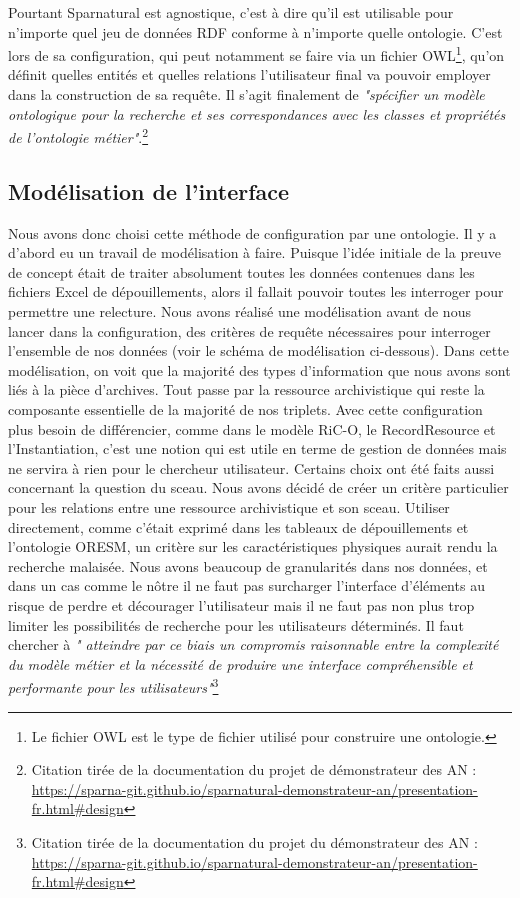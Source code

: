 \par
Pourtant Sparnatural est agnostique, c'est à dire qu'il est utilisable pour n'importe quel jeu de données RDF conforme à n'importe quelle ontologie. C'est lors de sa configuration, qui peut notamment se faire via un fichier OWL\footnote{Le fichier OWL est le type de fichier utilisé pour construire une ontologie.}, qu'on définit quelles entités et quelles relations l'utilisateur final va pouvoir employer dans la construction de sa requête. Il s'agit finalement de \textit{"spécifier un modèle ontologique pour la recherche et ses correspondances avec les classes et propriétés de l’ontologie métier"}.\footnote{Citation tirée de la documentation du projet de démonstrateur des AN : \href{https://sparna-git.github.io/sparnatural-demonstrateur-an/presentation-fr.html\#design}{https://sparna-git.github.io/sparnatural-demonstrateur-an/presentation-fr.html\#design}}


\subsection{Modélisation de l'interface}
Nous avons donc choisi cette méthode de configuration par une ontologie. Il y a d'abord eu un travail de modélisation à faire. Puisque l'idée initiale de la preuve de concept était de traiter absolument toutes les données contenues dans les fichiers Excel de dépouillements, alors il fallait pouvoir toutes les interroger pour permettre une relecture. Nous avons réalisé une modélisation avant de nous lancer dans la configuration, des critères de requête nécessaires pour interroger l'ensemble de nos données (voir le schéma de modélisation ci-dessous). Dans cette modélisation, on voit que la majorité des types d'information que nous avons sont liés à la pièce d'archives. Tout passe par la ressource archivistique qui reste la composante essentielle de la majorité de nos triplets. Avec cette configuration plus besoin de différencier, comme dans le modèle RiC-O, le RecordResource et l'Instantiation, c'est une notion qui est utile en terme de gestion de données mais ne servira à rien pour le chercheur utilisateur. Certains choix ont été faits aussi concernant la question du sceau. Nous avons décidé de créer un critère particulier pour les relations entre une ressource archivistique et son sceau. Utiliser directement, comme c'était exprimé dans les tableaux de dépouillements et l'ontologie ORESM, un critère sur les caractéristiques physiques aurait rendu la recherche malaisée. Nous avons beaucoup de granularités dans nos données, et dans un cas comme le nôtre il ne faut pas surcharger l'interface d'éléments au risque de perdre et décourager l'utilisateur mais il ne faut pas non plus trop limiter les possibilités de recherche pour les utilisateurs déterminés. Il faut chercher à \textit{" atteindre par ce biais un compromis raisonnable entre la complexité du modèle métier et la nécessité de produire une interface compréhensible et performante pour les utilisateurs"}\footnote{Citation tirée de la documentation du projet du démonstrateur des AN : \href{https://sparna-git.github.io/sparnatural-demonstrateur-an/presentation-fr.html\#design}{https://sparna-git.github.io/sparnatural-demonstrateur-an/presentation-fr.html\#design}}

